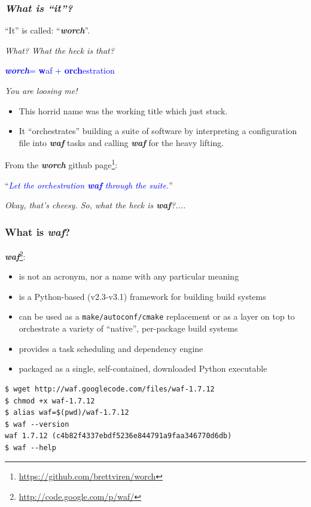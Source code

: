 \documentclass[xcolor=dvipsnames]{beamer}
\newcommand{\app}[1]{\textbf{\textit{#1}}\xspace}
\def\waf{\app{waf}}
\def\worch{\app{worch}}
\begin{document}
\begin{frame}
  \frametitle{\textit{What is ``\textbf{it}''?}}
  ``It'' is called: ``\worch''.

  \vspace{4mm}
  \textit{What?  What the heck is that?}
  \begin{center}
    \textcolor{blue}{\worch = \textbf{w}af + \textbf{orch}estration}
  \end{center}

  \textit{You are loosing me!}

  \begin{itemize}
  \item This horrid name was the working title which just stuck.
  \item It ``orchestrates'' building a suite of software by
    interpreting a configuration file into \waf tasks and calling \waf
    for the heavy lifting.
  \end{itemize}
  From the \worch github page\footnote{\url{https://github.com/brettviren/worch}}:
  \begin{center}
    ``\textcolor{blue}{\textit{Let the orchestration \waf through the suite.}}''
  \end{center}
  \textit{Okay, that's cheesy.  So, what the heck is \waf?....}
\end{frame}

\begin{frame}[fragile]
  \frametitle{What is \waf?}

  \waf\footnote{\url{http://code.google.com/p/waf/}}:
  \begin{itemize}
  \item is not an acronym, nor a name with any particular meaning
  \item is a Python-based (v2.3-v3.1) framework for building build systems
  \item can be used as a \texttt{make/autoconf/cmake} replacement or as a layer
    on top to orchestrate a variety of ``native'', per-package build systems
  \item provides a task scheduling and dependency engine
  \item packaged as a single, self-contained, downloaded Python executable
  \end{itemize}
\begin{verbatim}
$ wget http://waf.googlecode.com/files/waf-1.7.12
$ chmod +x waf-1.7.12
$ alias waf=$(pwd)/waf-1.7.12
$ waf --version
waf 1.7.12 (c4b82f4337ebdf5236e844791a9faa346770d6db)
$ waf --help
\end{verbatim}

\end{frame}
\end{document}
